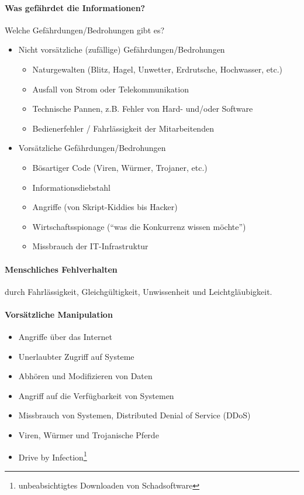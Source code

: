 \paragraph*{Was gefährdet die Informationen?} Welche Gefährdungen/Bedrohungen gibt es?
\begin{itemize}
    \item Nicht vorsätzliche (zufällige) Gefährdungen/Bedrohungen
    \begin{itemize}
        \item Naturgewalten (Blitz, Hagel, Unwetter, Erdrutsche, Hochwasser, etc.)
        \item Ausfall von Strom oder Telekommunikation
        \item Technische Pannen, z.B. Fehler von Hard- und/oder Software
        \item Bedienerfehler / Fahrlässigkeit der Mitarbeitenden
    \end{itemize}
    \item Vorsätzliche Gefährdungen/Bedrohungen
    \begin{itemize}
        \item Bösartiger Code (Viren, Würmer, Trojaner, etc.)
        \item Informationsdiebstahl
        \item Angriffe (von Skript-Kiddies bis Hacker)
        \item Wirtschaftsspionage ("`was die Konkurrenz wissen möchte"')
        \item Missbrauch der IT-Infrastruktur
    \end{itemize}
\end{itemize}

\paragraph*{Menschliches Fehlverhalten}durch Fahrlässigkeit, Gleichgültigkeit, Unwissenheit und Leichtgläubigkeit.


\paragraph*{Vorsätzliche Manipulation}
\begin{itemize}
    \item Angriffe über das Internet
    \item Unerlaubter Zugriff auf Systeme
    \item Abhören und Modifizieren von Daten
    \item Angriff auf die Verfügbarkeit von Systemen
    \item Missbrauch von Systemen, Distributed Denial of Service (DDoS)
    \item Viren, Würmer und Trojanische Pferde
    \item Drive by Infection\footnote{unbeabsichtigtes Downloaden von Schadsoftware}
\end{itemize}

